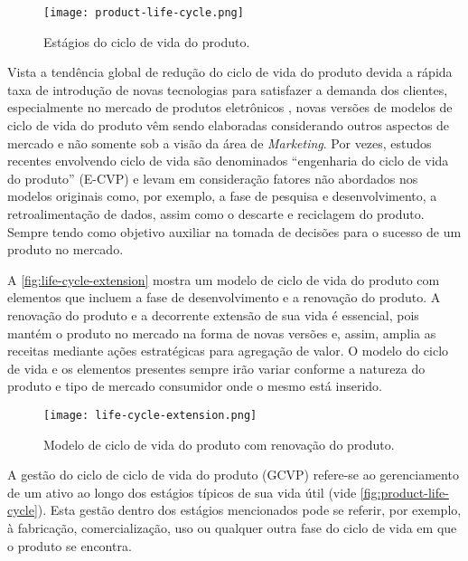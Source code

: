 	\begin{figure}[htb]
		\centering
		\caption{Estágios do ciclo de vida do produto.}
		\label{fig:product-life-cycle}
		\texttt{[image: product-life-cycle.png]}
	\end{figure}
	
	Vista a tendência global de redução do ciclo de vida do produto devida a rápida taxa de introdução de novas tecnologias para satisfazer a demanda dos clientes, especialmente no mercado de produtos eletrônicos \cite{trappey2008lifecycle}, novas versões de modelos de ciclo de vida do produto vêm sendo elaboradas considerando outros aspectos de mercado e não somente sob a visão da área de \textit{Marketing}. Por vezes, estudos recentes envolvendo ciclo de vida são denominados ``engenharia do ciclo de vida do produto'' (E-CVP) \cite{cao2012lifecycle} e levam em consideração fatores não abordados nos modelos originais como, por exemplo, a fase de pesquisa e desenvolvimento, a retroalimentação de dados, assim como o descarte e reciclagem do produto. Sempre tendo como objetivo auxiliar na tomada de decisões para o sucesso de um produto no mercado.
	
	A \autoref{fig:life-cycle-extension} mostra um modelo de ciclo de vida do produto com elementos que incluem a fase de desenvolvimento e a renovação do produto. A renovação do produto e a decorrente extensão de sua vida é essencial, pois mantém o produto no mercado na forma de novas versões e, assim, amplia as receitas mediante ações estratégicas para agregação de valor. O modelo do ciclo de vida e os elementos presentes sempre irão variar conforme a natureza do produto e tipo de mercado consumidor onde o mesmo está inserido.
	
	\begin{figure}[htb]
		\centering
		\caption{Modelo de ciclo de vida do produto com renovação do produto.}
		\label{fig:life-cycle-extension}
		\texttt{[image: life-cycle-extension.png]}
	\end{figure}
	

	
	A gestão do ciclo de ciclo de vida do produto (GCVP) refere-se ao gerenciamento de um ativo ao longo dos estágios típicos de sua vida útil (vide \autoref{fig:product-life-cycle}). Esta gestão dentro dos estágios mencionados pode se referir, por exemplo, à fabricação, comercialização, uso ou qualquer outra fase do ciclo de vida em que o produto se encontra. 
	
